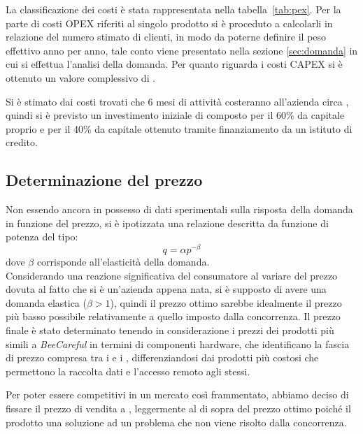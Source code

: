 La classificazione dei costi è stata rappresentata nella tabella~\ref{tab:pex}.
Per la parte di costi OPEX riferiti al singolo prodotto si è proceduto a
calcolarli in relazione del numero stimato di clienti, in modo da poterne
definire il peso effettivo anno per anno, tale conto viene presentato nella
sezione \ref{sec:domanda} in cui si effettua l'analisi della domanda. 
Per quanto riguarda i costi CAPEX si è ottenuto un valore complessivo di
.




Si è stimato dai costi trovati che 6 mesi di attività costeranno all’azienda
circa , quindi si è previsto un investimento iniziale di 
composto per il 60\% da capitale proprio e per il 40\% da capitale ottenuto
tramite finanziamento da un istituto di credito.
\subsection{Determinazione del prezzo}
Non essendo ancora in possesso di dati sperimentali sulla risposta della domanda
in funzione del prezzo, si è ipotizzata una relazione descritta da funzione di
potenza del tipo: 
\begin{displaymath}
q = \alpha p^{-\beta}
\end{displaymath}
dove $\beta$ corrisponde all’elasticità della domanda.\\
Considerando una reazione significativa del consumatore al variare del prezzo
dovuta al fatto che si è un’azienda appena nata, si è supposto di avere una
domanda elastica ($\beta > 1$), quindi il prezzo ottimo sarebbe idealmente il
prezzo più basso possibile relativamente a quello imposto dalla concorrenza.
Il prezzo finale è stato determinato tenendo in considerazione i prezzi dei
prodotti più simili a \textit{BeeCareful} in termini di componenti hardware, che
identificano la fascia di prezzo compresa tra i  e i ,
differenziandosi dai prodotti più costosi che permettono la raccolta dati
e l’accesso remoto agli stessi.

Per poter essere competitivi in un mercato così frammentato, abbiamo deciso di
fissare il prezzo di vendita a , leggermente al di sopra del prezzo
ottimo poiché il prodotto una soluzione ad un problema che non viene risolto
dalla concorrenza.
